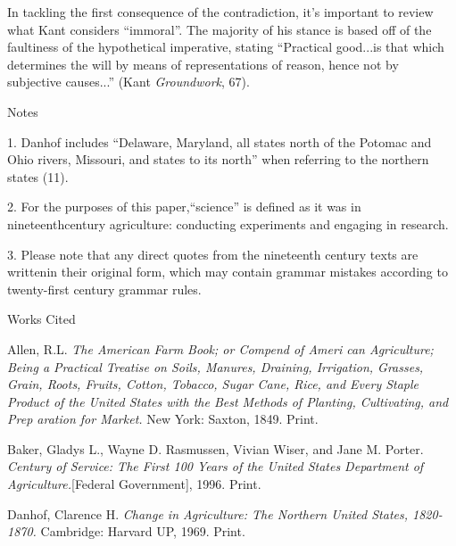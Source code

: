 \documentclass[12pt]{article}
\newcommand{\bibent}{\noindent \hangindent 40pt}
\newenvironment{workscited}{\newpage \begin{center} Works Cited \end{center}}{\newpage }
\begin{document}
\begin{flushleft}
In tackling the first consequence of the contradiction, it's important to review what Kant considers ``immoral''. The majority of his stance is based off of the faultiness of the hypothetical imperative, stating ``Practical good...is that which determines the will by means of representations of reason, hence not by subjective causes...'' (Kant \textit{Groundwork}, 67).
\newpage


\begin{center}
Notes
\end{center}


\setlength{\parindent}{0.5in}

1. Danhof includes “Delaware, Maryland, all states north of the Potomac and Ohio rivers, Missouri, and states to its north” when referring to the northern states (11).


2. For the purposes of this paper,“science” is defined as it was in nineteenthcentury agriculture: conducting experiments and engaging in research.


3. Please note that any direct quotes from the nineteenth century texts are writtenin their original form, which may contain grammar mistakes according to twenty-first century grammar rules.

\begin{workscited}

\bibent
Allen, R.L. \textit{The American Farm Book; or Compend of Ameri can Agriculture; Being a Practical Treatise on Soils, Manures, Draining, Irrigation, Grasses, Grain, Roots, Fruits, Cotton, Tobacco, Sugar Cane, Rice, and Every Staple Product of the United States with the Best Methods of Planting, Cultivating, and Prep aration for Market.} New York: Saxton, 1849. Print.

\bibent
Baker, Gladys L., Wayne D. Rasmussen, Vivian Wiser, and Jane M. Porter. \textit{Century of Service: The First 100 Years of the United States Department of Agriculture.}[Federal Government], 1996. Print.

\bibent
Danhof, Clarence H. \textit{Change in Agriculture: The Northern United States, 1820-1870.} Cambridge: Harvard UP, 1969. Print.


\end{workscited}

\end{flushleft}
\end{document}
